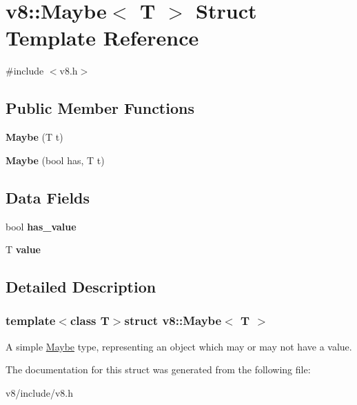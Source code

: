 \hypertarget{structv8_1_1Maybe}{\section{v8\-:\-:Maybe$<$ T $>$ Struct Template Reference}
\label{structv8_1_1Maybe}
}


{\ttfamily \#include $<$v8.\-h$>$}

\subsection*{Public Member Functions}
\begin{DoxyCompactItemize}
\item 
\hypertarget{structv8_1_1Maybe_ae2281300d88d2d27681e28bc18535105}{{\bfseries Maybe} (T t)}\label{structv8_1_1Maybe_ae2281300d88d2d27681e28bc18535105}

\item 
\hypertarget{structv8_1_1Maybe_aef0c1b7d8dcab90514924e3e15e31a90}{{\bfseries Maybe} (bool has, T t)}\label{structv8_1_1Maybe_aef0c1b7d8dcab90514924e3e15e31a90}

\end{DoxyCompactItemize}
\subsection*{Data Fields}
\begin{DoxyCompactItemize}
\item 
\hypertarget{structv8_1_1Maybe_afd7a3ebca6d97a4b87f2829a28723b0b}{bool {\bfseries has\-\_\-value}}\label{structv8_1_1Maybe_afd7a3ebca6d97a4b87f2829a28723b0b}

\item 
\hypertarget{structv8_1_1Maybe_ac3e067a7ae1b5cc92c2f570499db31ea}{T {\bfseries value}}\label{structv8_1_1Maybe_ac3e067a7ae1b5cc92c2f570499db31ea}

\end{DoxyCompactItemize}


\subsection{Detailed Description}
\subsubsection*{template$<$class T$>$struct v8\-::\-Maybe$<$ T $>$}

A simple \hyperlink{structv8_1_1Maybe}{Maybe} type, representing an object which may or may not have a value. 

The documentation for this struct was generated from the following file\-:\begin{DoxyCompactItemize}
\item 
v8/include/v8.\-h\end{DoxyCompactItemize}
